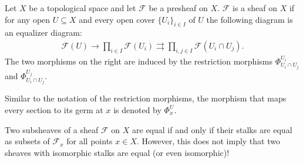     \begin{property}
        Let $X$ be a topological space and let $\mathcal{F}$ be a presheaf on $X$. $\mathcal{F}$ is a sheaf on $X$ if for any open $U\subseteq X$ and every open cover $\{U_i\}_{i\in I}$ of $U$ the following diagram is an equalizer diagram:
        \begin{gather}
            \label{sheaf:equalizer}
            \mathcal{F}(U)\rightarrow\prod_{i\in I}\mathcal{F}(U_i)\rightrightarrows\prod_{i, j\in I}\mathcal{F}(U_i\cap U_j).
        \end{gather}
        The two morphisms on the right are induced by the restriction morphisms $\Phi^{U_i}_{U_i\cap U_j}$ and $\Phi^{U_j}_{U_i\cap U_j}$.
    \end{property}

    \begin{notation}
        Similar to the notation of the restriction morphisms, the morphism that maps every section to its germ at $x$ is denoted by $\Phi^U_x$.
    \end{notation}

    \begin{property}
        Two subsheaves of a sheaf $\mathcal{F}$ on $X$ are equal if and only if their stalks are equal as subsets of $\mathcal{F}_x$ for all points $x\in X$. However, this does not imply that two sheaves with isomorphic stalks are equal (or even isomorphic)!
    \end{property}

